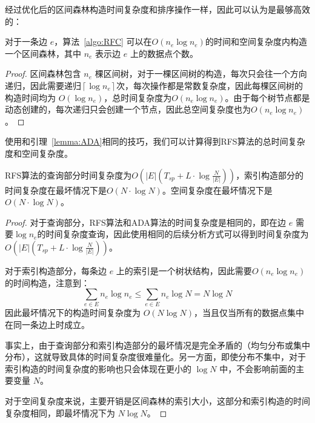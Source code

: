 经过优化后的区间森林构造时间复杂度和排序操作一样，因此可以认为是最够高效的：

\begin{lemma}
	对于一条边 $e$，算法~\ref{algo:RFC} 可以在$O(n_e\log{n_e})$的时间和空间复杂度内构造一个区间森林，其中 $n_e$ 表示边 $e$ 上的数据点个数。
\end{lemma}

\begin{proof}
	区间森林包含 $n_e$ 棵区间树，对于一棵区间树的构造，每次只会往一个方向递归，因此需要递归$\left\lceil\log{n_e}\right\rceil$次，每次操作都是常数复杂度，因此每棵区间树的构造时间均为 $O(\log{n_e})$，总时间复杂度为$O(n_e\log{n_e})$。由于每个树节点都是动态创建的，每次递归只会创建一个节点，因此总空间复杂度也为$O(n_e\log{n_e})$。
\end{proof}

使用和引理~\ref{lemma:ADA}相同的技巧，我们可以计算得到RFS算法的总时间复杂度和空间复杂度。

\begin{lemma}
	\label{lemma:RFS_1}
	RFS算法的查询部分时间复杂度为$O(\vert E \vert (T_{sp} + L \cdot \log\frac{N}{\vert E \vert}))$，索引构造部分的时间复杂度在最坏情况下是$O(N \cdot \log{N})$。空间复杂度在最坏情况下是$O(N \cdot \log{N})$。
\end{lemma}
\begin{proof}
	对于查询部分，RFS算法和ADA算法的时间复杂度是相同的，即在边 $e$ 需要$\log{n_e}$的时间复杂度查询，因此使用相同的后续分析方式可以得到时间复杂度为$O(\vert E \vert (T_{sp} + L \cdot \log\frac{N}{\vert E \vert}))$。

	对于索引构造部分，每条边 $e$ 上的索引是一个树状结构，因此需要$O(n_e \log{n_e})$的时间构造，注意到：
	\begin{equation*}
		\sum_{e \in E} n_e \log{n_e} \le \sum_{e \in E} n_e \log N = N \log N
	\end{equation*}
	因此最坏情况下的构造时间复杂度为 $O(N \log N)$，当且仅当所有的数据点集中在同一条边上时成立。

	事实上，由于查询部分和索引构造部分的最坏情况是完全矛盾的（均匀分布或集中分布），这就导致具体的时间复杂度很难量化。另一方面，即使分布不集中，对于索引构造的时间复杂度的影响也只会体现在更小的 $\log N$ 中，不会影响前面的主要变量 $N$。

	对于空间复杂度来说，主要开销是区间森林的索引大小，这部分和索引构造的时间复杂度相同，即最坏情况下为 $N \log N$。
\end{proof}



	

